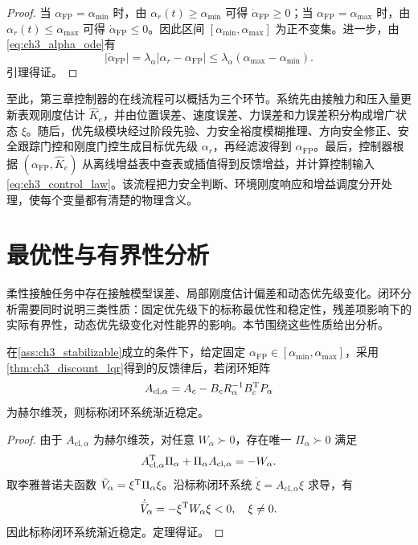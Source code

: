 \begin{proof}
当 $\alpha_{\mathrm{FP}}=\alpha_{\min}$ 时，由 $\alpha_r(t)\ge\alpha_{\min}$ 可得 $\dot\alpha_{\mathrm{FP}}\ge0$；当 $\alpha_{\mathrm{FP}}=\alpha_{\max}$ 时，由 $\alpha_r(t)\le\alpha_{\max}$ 可得 $\dot\alpha_{\mathrm{FP}}\le0$。因此区间 $[\alpha_{\min},\alpha_{\max}]$ 为正不变集。进一步，由\eqref{eq:ch3_alpha_ode}有
\begin{equation}
  |\dot\alpha_{\mathrm{FP}}|=\lambda_\alpha|\alpha_r-\alpha_{\mathrm{FP}}|\le\lambda_\alpha(\alpha_{\max}-\alpha_{\min}).
\end{equation}
引理得证。
\end{proof}

至此，第三章控制器的在线流程可以概括为三个环节。系统先由接触力和压入量更新表观刚度估计 $\hat K_e$，并由位置误差、速度误差、力误差和力误差积分构成增广状态 $\xi$。随后，优先级模块经过阶段先验、力安全裕度模糊推理、方向安全修正、安全跟踪门控和刚度门控生成目标优先级 $\alpha_r$，再经滤波得到 $\alpha_{\mathrm{FP}}$。最后，控制器根据 $(\alpha_{\mathrm{FP}},\hat K_e)$ 从离线增益表中查表或插值得到反馈增益，并计算控制输入\eqref{eq:ch3_control_law}。该流程把力安全判断、环境刚度响应和增益调度分开处理，使每个变量都有清楚的物理含义。

\section{最优性与有界性分析}
\label{sec:ch3_theory}

柔性接触任务中存在接触模型误差、局部刚度估计偏差和动态优先级变化。闭环分析需要同时说明三类性质：固定优先级下的标称最优性和稳定性，残差项影响下的实际有界性，动态优先级变化对性能界的影响。本节围绕这些性质给出分析。

\begin{theorem}[固定力位优先级下的闭环稳定性]
\label{thm:ch3_fixed_stability}
在\cref{ass:ch3_stabilizable}成立的条件下，给定固定 $\alpha_{\mathrm{FP}}\in[\alpha_{\min},\alpha_{\max}]$，采用\cref{thm:ch3_discount_lqr}得到的反馈律后，若闭环矩阵
\begin{equation}
  A_{\mathrm{cl},\alpha}=A_c-B_cR_\alpha^{-1}B_c^{\mathrm{T}}P_\alpha
  \label{eq:ch3_Acl}
\end{equation}
为赫尔维茨，则标称闭环系统渐近稳定。
\end{theorem}

\begin{proof}
由于 $A_{\mathrm{cl},\alpha}$ 为赫尔维茨，对任意 $W_\alpha\succ0$，存在唯一 $\Pi_\alpha\succ0$ 满足
\begin{equation}
  A_{\mathrm{cl},\alpha}^{\mathrm{T}}\Pi_\alpha+\Pi_\alpha A_{\mathrm{cl},\alpha}=-W_\alpha .
  \label{eq:ch3_lyap_equation}
\end{equation}
取李雅普诺夫函数 $\bar V_\alpha=\xi^{\mathrm{T}}\Pi_\alpha\xi$。沿标称闭环系统 $\dot\xi=A_{\mathrm{cl},\alpha}\xi$ 求导，有
\begin{equation}
  \dot{\bar V}_\alpha=-\xi^{\mathrm{T}}W_\alpha\xi<0,\quad \xi\ne0 .
\end{equation}
因此标称闭环系统渐近稳定。定理得证。
\end{proof}


